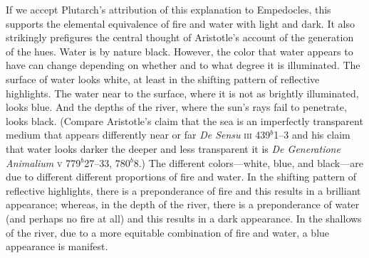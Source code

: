 If we accept Plutarch's attribution of this explanation to Empedocles, this supports the elemental equivalence of fire and water with light and dark. It also strikingly prefigures the central thought of Aristotle's account of the generation of the hues. Water is by nature black. However, the color that water appears to have can change depending on whether and to what degree it is illuminated. The surface of water looks white, at least in the shifting pattern of reflective highlights. The water near to the surface, where it is not as brightly illuminated, looks blue. And the depths of the river, where the sun's rays fail to penetrate, looks black. (Compare Aristotle's claim that the sea is an imperfectly transparent medium that appears differently near or far \emph{De Sensu} \textsc{iii} 439\( ^{b} \)1--3 and his claim that water looks darker the deeper and less transparent it is \emph{De Generatione Animalium} \textsc{v} 779\( ^{b} \)27--33, 780\( ^{b} \)8.) The different colors---white, blue, and black---are due to different different proportions of fire and water. In the shifting pattern of reflective highlights, there is a preponderance of fire and this results in a brilliant appearance; whereas, in the depth of the river, there is a preponderance of water (and perhaps no fire at all) and this results in a dark appearance. In the shallows of the river, due to a more equitable combination of fire and water, a blue appearance is manifest.

